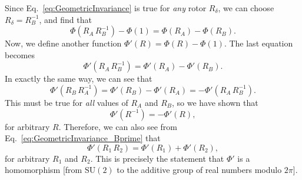 \documentclass[aps,prd,amsmath,floatfix,twocolumn,superscriptaddress,nofootinbib,showpacs]{revtex4-1}
\newcommand{\SU}{\ensuremath{\mathrm{SU}}}
\begin{document}
Since Eq.~\eqref{eq:GeometricInvariance} is true for \emph{any} rotor
$R_{\delta}$, we can choose $R_{\delta} = R_{B}^{-1}$, and find that
\begin{equation}
  \label{eq:GeometricInvariance_B}
  \Phi(R_{A}\, R_{B}^{-1}) - \Phi(1) = \Phi(R_{A}) - \Phi(R_{B}).
\end{equation}
Now, we define another function $\Phi'(R) = \Phi(R) - \Phi(1)$.  The
last equation becomes
\begin{equation}
  \label{eq:GeometricInvariance_Bprime}
  \Phi'(R_{A}\, R_{B}^{-1}) = \Phi'(R_{A}) - \Phi'(R_{B}).
\end{equation}
In exactly the same way, we can see that
\begin{equation}
  \label{eq:GeometricInvariance_Aprime}
  \Phi'(R_{B}\, R_{A}^{-1}) = \Phi'(R_{B}) - \Phi'(R_{A}) = -
  \Phi'(R_{A}\, R_{B}^{-1}).
\end{equation}
This must be true for \emph{all} values of $R_{A}$ and $R_{B}$, so we
have shown that
\begin{equation}
  \label{eq:Inversion}
  \Phi'(R^{-1}) = - \Phi'(R),
\end{equation}
for arbitrary $R$.  Therefore, we can also see from
Eq.~\eqref{eq:GeometricInvariance_Bprime} that
\begin{equation}
  \label{eq:Homomorphism}
  \Phi'(R_{1}\, R_{2}) = \Phi'(R_{1}) + \Phi'(R_{2}),
\end{equation}
for arbitrary $R_{1}$ and $R_{2}$.  This is precisely the statement
that $\Phi'$ is a homomorphism [from $\SU(2)$ to the additive group of
real numbers modulo $2\pi$].
\end{document}
